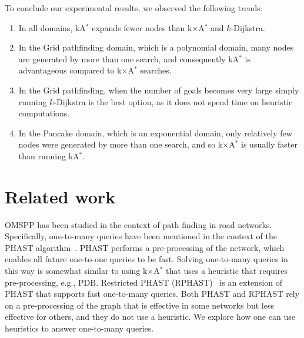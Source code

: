 \documentclass[smallextended]{svjour3}       %
\newcommand{\kD}{$k$-Dijkstra\xspace}
\newcommand{\omspp}{\ac{OMSPP}\xspace}
\newcommand{\kastar}{kA$^*$\xspace}
\newcommand{\kastarvar}[1]{\textup{kA}$^*_{#1}$\xspace}
\newcommand{\kastarmin}{\kastarvar{\min}}
\newcommand{\kastarmax}{\kastarvar{\max}}
\newcommand{\kxastar}{k$\times$A$^*$\xspace}
\begin{document}
To conclude our experimental results, we observed the following trends:
\begin{enumerate}
	\item In all domains, \kastar expands fewer nodes than \kxastar and \kD. 
	\item In the Grid pathfinding domain, which is a polynomial domain, many nodes are generated by more than one search, and consequently \kastar is advantageous compared to \kxastar searches.	
	\item In the Grid pathfinding, when the number of goals becomes very large simply running \kD is the best option, as it does not spend time on heuristic computations.
	\item In the Pancake domain, which is an exponential domain, only relatively few nodes were generated by more than one search, and so \kxastar is usually faster than running \kastar.
\end{enumerate}



\section{Related work}
\label{sec:related-work}


\omspp has been studied in the context of path finding in road networks. 
Specifically, one-to-many queries have been mentioned in the context of the PHAST algorithm~\cite{delling2011phast}. PHAST performs a pre-processing of the network, which enables all future one-to-one queries to be fast. 
Solving one-to-many queries in this way is somewhat similar to using \kxastar that uses a heuristic that requires pre-processing, e.g., PDB.  
Restricted PHAST (RPHAST)~\cite{delling2011faster} is an extension of PHAST that supports fast one-to-many queries. Both PHAST and RPHAST rely on a pre-processing of the graph that is effective in some networks but less effective for others, and they do not use a heuristic. We explore how one can use heuristics to answer one-to-many queries. 
\end{document}

